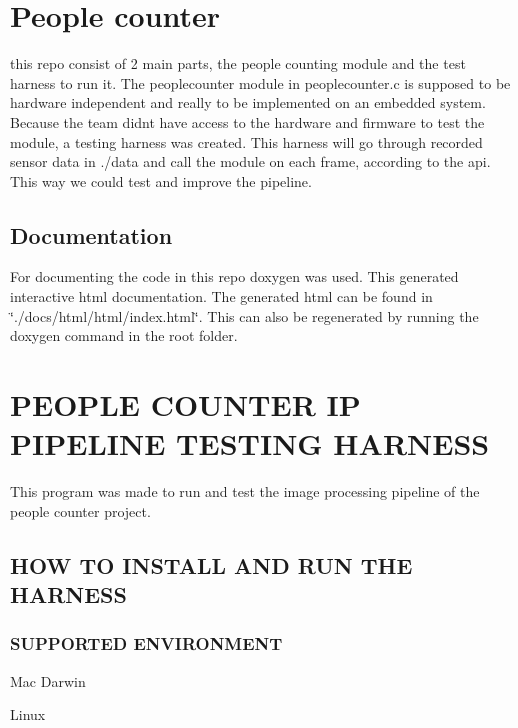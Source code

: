 \section*{People counter}

this repo consist of 2 main parts, the people counting module and the test harness to run it. The peoplecounter module in peoplecounter.\+c is supposed to be hardware independent and really to be implemented on an embedded system. Because the team didn\textquotesingle{}t have access to the hardware and firmware to test the module, a testing harness was created. This harness will go through recorded sensor data in ./data and call the module on each frame, according to the api. This way we could test and improve the pipeline.

\subsection*{Documentation}

For documenting the code in this repo doxygen was used. This generated interactive html documentation. The generated html can be found in \char`\"{}./docs/html/html/index.\+html\char`\"{}. This can also be regenerated by running the doxygen command in the root folder.

\section*{P\+E\+O\+P\+LE C\+O\+U\+N\+T\+ER IP P\+I\+P\+E\+L\+I\+NE T\+E\+S\+T\+I\+NG H\+A\+R\+N\+E\+SS}

This program was made to run and test the image processing pipeline of the people counter project.

\subsection*{H\+OW TO I\+N\+S\+T\+A\+LL A\+ND R\+UN T\+HE H\+A\+R\+N\+E\+SS}

\subsubsection*{S\+U\+P\+P\+O\+R\+T\+ED E\+N\+V\+I\+R\+O\+N\+M\+E\+NT}


\begin{DoxyItemize}
\item Mac Darwin
\item Linux
\end{DoxyItemize}

